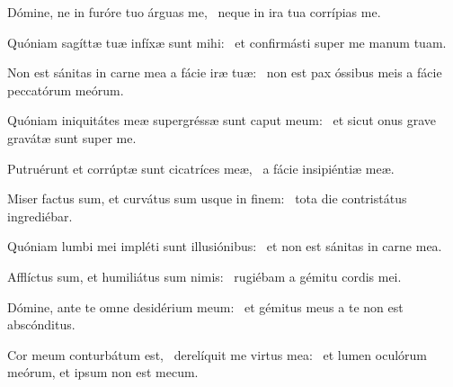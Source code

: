 \item Dómine, ne in furóre tuo árguas me,~\psstar{} neque in ira tua corrípias me.

\item Quóniam sagíttæ tuæ infíxæ sunt mihi:~\psstar{} et confirmásti super me manum tuam.

\item Non est sánitas in carne mea a fácie iræ tuæ:~\psstar{} non est pax óssibus meis a fácie peccatórum meórum.

\item Quóniam iniquitátes meæ supergréssæ sunt caput meum:~\psstar{} et sicut onus grave gravátæ sunt super me.

\item Putruérunt et corrúptæ sunt cicatríces meæ,~\psstar{} a fácie insipiéntiæ meæ.

\item Miser factus sum, et curvátus sum usque in finem:~\psstar{} tota die contristátus ingrediébar.

\item Quóniam lumbi mei impléti sunt illusiónibus:~\psstar{} et non est sánitas in carne mea.

\item Afflíctus sum, et humiliátus sum nimis:~\psstar{} rugiébam a gémitu cordis mei.

\item Dómine, ante te omne desidérium meum:~\psstar{} et gémitus meus a te non est abscónditus.

\item Cor meum conturbátum est,~\pscross{} derelíquit me virtus mea:~\psstar{} et lumen oculórum meórum, et ipsum non est mecum.
